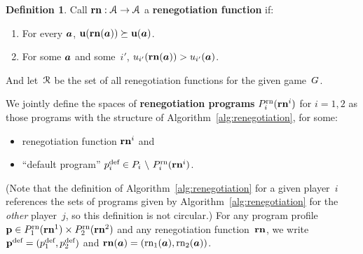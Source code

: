 \documentclass[sigconf]{aamas}
\theoremstyle{definition}
\newtheorem{definition}{Definition} %
\begin{document}
\begin{definition}
Call 
$\mathbf{rn} : \mathcal{A} \to \mathcal{A}$
a \textbf{renegotiation function}
if:
\begin{enumerate}
    \item For every $\boldsymbol{a}$,
    $\textbf{u}(\mathbf{rn}(\boldsymbol{a})) \succeq \textbf{u}(\boldsymbol{a})$.
    \item For some $\boldsymbol{a}$
    and some~$i'$,
    $u_{i'}(\mathbf{rn}(\boldsymbol{a})) > u_{i'}(\boldsymbol{a})$.
\end{enumerate}
And let~$\mathcal{R}$ be the set of all renegotiation functions for the
given game~$G$.
\end{definition}

We jointly define
the spaces of 
\textbf{renegotiation programs} $P_i^{\textnormal{rn}}(\mathbf{rn}^i)$
for $i=1,2$
as those programs with
the structure of Algorithm~\ref{alg:renegotiation}, for
some:
\begin{itemize}
    \item renegotiation
    function
    $\mathbf{rn}^i$ and
    \item ``default program''
    $p_i^{\textnormal{def}} \in P_i \ \backslash \ P_i^{\textnormal{rn}}(\mathbf{rn}^i)$.
\end{itemize}
(Note that the definition of Algorithm~\ref{alg:renegotiation}
for a given player~$i$ references the sets of programs given by 
Algorithm~\ref{alg:renegotiation} for
the \textit{other} player~$j$,
so this definition is not circular.)
For any program profile~$\textbf{p} \in  P_1^{\textnormal{rn}}(\mathbf{rn}^1) \times P_2^{\textnormal{rn}}(\mathbf{rn}^2)$ and any renegotiation function~$\mathbf{rn}$, we write 
${\textbf{p}}^{\textnormal{def}} = (p_1^{\textnormal{def}}, p_2^{\textnormal{def}})$
and
$\mathbf{rn}(\boldsymbol{a}) = (\textnormal{rn}_1(\boldsymbol{a}), \textnormal{rn}_2(\boldsymbol{a}))$.
\end{document}
